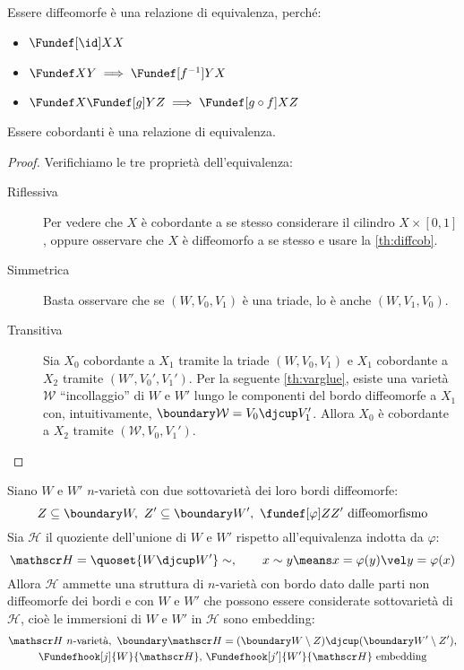 \begin{oss}
	Essere diffeomorfe è una relazione di equivalenza, perché:
	\begin{itemize}
		\item $\Fundef[\id]XX$
		\item $\Fundef XY\implies\Fundef[f^{-1}]YX$
		\item $\Fundef X{\Fundef[g]YZ}\implies\Fundef[g\circ f]XZ$
	\end{itemize}
\end{oss}

\begin{lemma}
	Essere cobordanti è una relazione di equivalenza.
\end{lemma}

\begin{proof}
	Verifichiamo le tre proprietà dell'equivalenza:
	\begin{description}
		\item[Riflessiva]
			Per vedere che $X$ è cobordante a se stesso considerare il cilindro $X\times[0,1]$, oppure osservare che $X$ è diffeomorfo a se stesso e usare la \autoref{th:diffcob}.
		\item[Simmetrica]
			Basta osservare che se $(W,V_0,V_1)$ è una triade, lo è anche $(W,V_1,V_0)$.
		\item[Transitiva]
			Sia $X_0$ cobordante a $X_1$ tramite la triade $(W,V_0,V_1)$ e $X_1$ cobordante a $X_2$ tramite $(W',V_0',V_1')$.
			Per la seguente \autoref{th:varglue}, esiste una varietà $\mathcal W$ ``incollaggio'' di $W$ e $W'$ lungo le componenti del bordo diffeomorfe a $X_1$ con, intuitivamente, $\boundary\mathcal W=V_0\djcup V_1'$.
			Allora $X_0$ è cobordante a $X_2$ tramite $(\mathcal W,V_0,V_1')$.
			\qedhere
	\end{description}
\end{proof}

\begin{center}
	\vspace{-7mm} %
	
\end{center}

\begin{prop}[Incollaggio]
	\label{th:varglue}
	Siano $W$ e $W'$ $n$-varietà con due sottovarietà dei loro bordi diffeomorfe:
	\[Z\subseteq\boundary W,\ Z'\subseteq\boundary W',\ \fundef[\varphi]Z{Z'}\text{ diffeomorfismo}\]
	Sia $\mathscr H$ il quoziente dell'unione di $W$ e $W'$ rispetto all'equivalenza indotta da $\varphi$:
	\[\mathscr H=\quoset{W\djcup W'}\sim,\qquad x\sim y\means x=\varphi(y)\vel y=\varphi(x)\]
	Allora $\mathscr H$ ammette una struttura di $n$-varietà con bordo dato dalle parti non diffeomorfe dei bordi e con $W$ e $W'$ che possono essere considerate sottovarietà di $\mathscr H$, cioè le immersioni di $W$ e $W'$ in $\mathscr H$ sono embedding:
	\begin{gather*}
		\mathscr H\text{ $n$-varietà},\ \boundary\mathscr H=(\boundary W\setminus Z)\djcup(\boundary W'\setminus Z'),\\
		\Fundefhook[j]{W}{\mathscr H},\,\Fundefhook[j']{W'}{\mathscr H}\text{ embedding}
	\end{gather*}
\end{prop}

